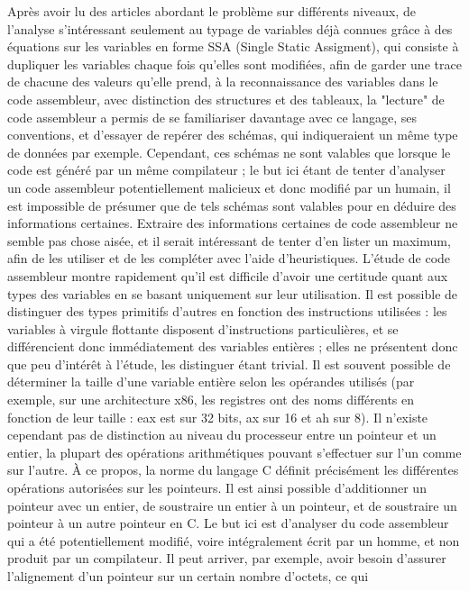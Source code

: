 \documentclass[a4paper,12pt]{article}
\begin{document}
Après avoir lu des articles abordant le problème sur différents niveaux,
de l'analyse s'intéressant seulement au typage de variables déjà connues
grâce à des équations sur les variables en forme SSA (Single Static 
Assigment), qui consiste à dupliquer les variables chaque fois qu'elles
sont modifiées, afin de garder une trace de chacune des valeurs qu'elle
prend, à la reconnaissance des variables dans le code assembleur, avec
distinction des structures et des tableaux, la "lecture" de code assembleur
a permis de se familiariser davantage avec ce langage, ses conventions,
et d'essayer de repérer des schémas, qui indiqueraient un même type 
de données par exemple. Cependant, ces schémas ne sont valables que lorsque
le code est généré par un même compilateur ; le but ici étant de tenter
d'analyser un code assembleur potentiellement malicieux et donc modifié
par un humain, il est impossible de présumer que de tels schémas sont
valables pour en déduire des informations certaines. Extraire des
informations certaines de code assembleur ne semble pas chose aisée, et il
serait intéressant de tenter d'en lister un maximum, afin de les utiliser
et de les compléter avec l'aide d'heuristiques. L'étude de code assembleur
montre rapidement qu'il est difficile d'avoir une certitude quant aux types
des variables en se basant uniquement sur leur utilisation. Il est possible
de distinguer des types primitifs d'autres en fonction des instructions
utilisées : les variables à virgule flottante disposent d'instructions
particulières, et se différencient donc immédiatement des variables
entières ; elles ne présentent donc que peu d'intérêt à l'étude, les
distinguer étant trivial. Il est souvent possible de déterminer la taille
d'une variable entière selon les opérandes utilisés (par exemple, sur une
architecture x86, les registres ont des noms différents en fonction de leur
taille : eax est sur 32 bits, ax sur 16 et ah sur 8). Il n'existe cependant
pas de distinction au niveau du processeur entre un pointeur et un entier,
la plupart des opérations arithmétiques pouvant s'effectuer sur l'un comme
sur l'autre. À ce propos, la norme du langage C définit précisément les
différentes opérations autorisées sur les pointeurs. Il est ainsi possible
d'additionner un pointeur avec un entier, de soustraire un entier à un
pointeur, et de soustraire un pointeur à un autre pointeur en C. Le but ici
est d'analyser du code assembleur qui a été
potentiellement modifié, voire intégralement écrit par un homme,
et non produit par un compilateur. Il peut arriver, par exemple, avoir besoin
d'assurer l'alignement d'un pointeur sur un certain nombre d'octets, ce qui
\end{document}
